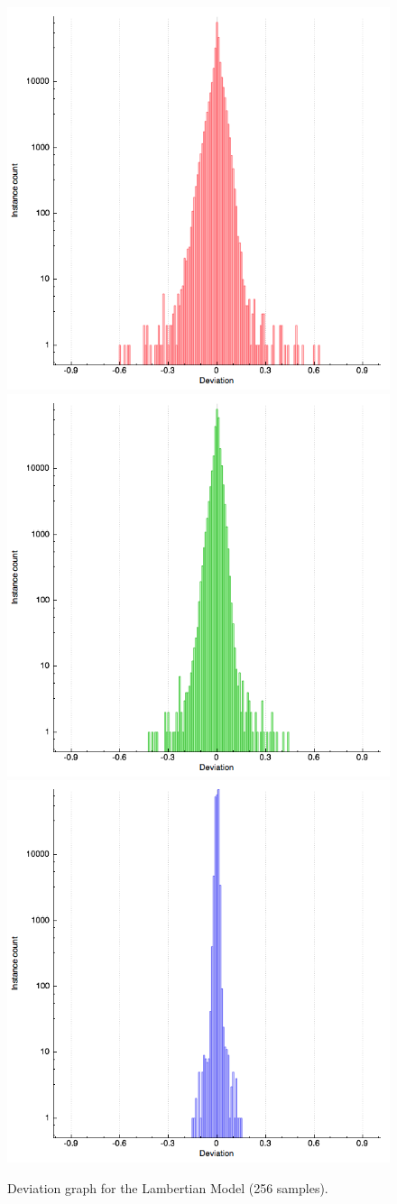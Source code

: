 \documentclass{article}
\begin{document}
\begin{figure}[p]
\centering
\includegraphics[width=.5\textwidth]{assets/diffuse-brdf_plot_6_red} \\
\includegraphics[width=.5\textwidth]{assets/diffuse-brdf_plot_6_green} \\
\includegraphics[width=.5\textwidth]{assets/diffuse-brdf_plot_6_blue}
\caption{Deviation graph for the Lambertian Model (256 samples).}
\label{fig:lamb_stdev_details}
\end{figure}
\end{document}
